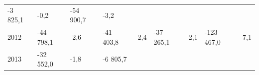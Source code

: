 \begin{longtable}[]{@{}lllllllll@{}}
\begin{minipage}[t]{0.12\columnwidth}
-3 825,1\strut
\end{minipage} & \begin{minipage}[t]{0.06\columnwidth}\raggedright
-0,2\strut
\end{minipage} & \begin{minipage}[t]{0.09\columnwidth}\raggedright
-54 900,7\strut
\end{minipage} & \begin{minipage}[t]{0.06\columnwidth}\raggedright
-3,2\strut
\end{minipage}\tabularnewline
\begin{minipage}[t]{0.05\columnwidth}\raggedright
2012\strut
\end{minipage} & \begin{minipage}[t]{0.10\columnwidth}\raggedright
-44 798,1\strut
\end{minipage} & \begin{minipage}[t]{0.06\columnwidth}\raggedright
-2,6\strut
\end{minipage} & \begin{minipage}[t]{0.16\columnwidth}\raggedright
-41 403,8\strut
\end{minipage} & \begin{minipage}[t]{0.06\columnwidth}\raggedright
-2,4\strut
\end{minipage} & \begin{minipage}[t]{0.12\columnwidth}\raggedright
-37 265,1\strut
\end{minipage} & \begin{minipage}[t]{0.06\columnwidth}\raggedright
-2,1\strut
\end{minipage} & \begin{minipage}[t]{0.09\columnwidth}\raggedright
-123 467,0\strut
\end{minipage} & \begin{minipage}[t]{0.06\columnwidth}\raggedright
-7,1\strut
\end{minipage}\tabularnewline
\begin{minipage}[t]{0.05\columnwidth}\raggedright
2013\strut
\end{minipage} & \begin{minipage}[t]{0.10\columnwidth}\raggedright
-32 552,0\strut
\end{minipage} & \begin{minipage}[t]{0.06\columnwidth}\raggedright
-1,8\strut
\end{minipage} & \begin{minipage}[t]{0.16\columnwidth}\raggedright
-6 805,7\strut

\end{minipage}
\end{longtable}
